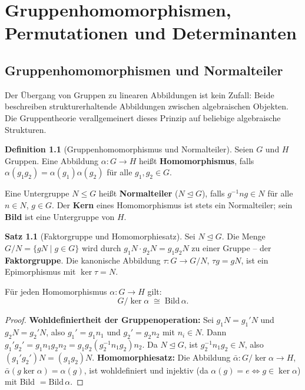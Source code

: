 ﻿\documentclass[a4paper,12pt]{report}
\theoremstyle{definition}
\newtheorem{definition}{Definition}
\newtheorem{satz}{Satz}
\begin{document}
\chapter{Gruppenhomomorphismen, Permutationen und Determinanten}

\section{Gruppenhomomorphismen und Normalteiler}

Der Übergang von Gruppen zu linearen Abbildungen ist kein Zufall:
Beide beschreiben strukturerhaltende Abbildungen zwischen algebraischen
Objekten. Die Gruppentheorie verallgemeinert dieses Prinzip auf
beliebige algebraische Strukturen.

\begin{definition}[Gruppenhomomorphismus und Normalteiler]
    Seien $G$ und $H$ Gruppen. Eine Abbildung $\alpha : G \to H$ heißt
    \textbf{Homomorphismus}, falls $\alpha(g_1 g_2) = \alpha(g_1)\alpha(g_2)$
    für alle $g_1, g_2 \in G$.

    Eine Untergruppe $N \leq G$ heißt \textbf{Normalteiler} ($N \trianglelefteq G$),
    falls $g^{-1}ng \in N$ für alle $n \in N$, $g \in G$. Der \textbf{Kern} eines
    Homomorphismus ist stets ein Normalteiler; sein \textbf{Bild} ist eine
    Untergruppe von $H$.
\end{definition}

\begin{satz}[Faktorgruppe und Homomorphiesatz]
    Sei $N \trianglelefteq G$. Die Menge $G/N = \{gN \mid g \in G\}$ wird
    durch $g_1 N \cdot g_2 N = g_1 g_2 N$ zu einer Gruppe -- der
    \textbf{Faktorgruppe}. Die kanonische Abbildung $\tau : G \to G/N$,
    $\tau g = gN$, ist ein Epimorphismus mit $\ker \tau = N$.

    Für jeden Homomorphismus $\alpha : G \to H$ gilt:
    \[
        G / \ker \alpha \;\cong\; \mathrm{Bild}\, \alpha.
    \]
\end{satz}
\begin{proof}
    \textbf{Wohldefiniertheit der Gruppenoperation:} Sei $g_1 N = g_1' N$ und
    $g_2 N = g_2' N$, also $g_1' = g_1 n_1$ und $g_2' = g_2 n_2$ mit $n_i \in N$.
    Dann $g_1' g_2' = g_1 n_1 g_2 n_2 = g_1 g_2 (g_2^{-1} n_1 g_2) n_2$.
    Da $N \trianglelefteq G$, ist $g_2^{-1} n_1 g_2 \in N$, also
    $(g_1' g_2') N = (g_1 g_2) N$.
    \textbf{Homomorphiesatz:} Die Abbildung $\bar{\alpha} : G/\ker\alpha \to H$,
    $\bar{\alpha}(g \ker\alpha) = \alpha(g)$, ist wohldefiniert und injektiv
    (da $\alpha(g) = e \Leftrightarrow g \in \ker\alpha$) mit Bild $= \mathrm{Bild}\,\alpha$.
\end{proof}
\end{document}

